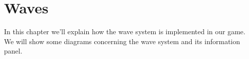 \section{Waves}
\label{sec:waves}

In this chapter we'll explain how the wave system is implemented in our game. 
We will show some diagrams concerning the wave system and its information 
panel.


\newpage



